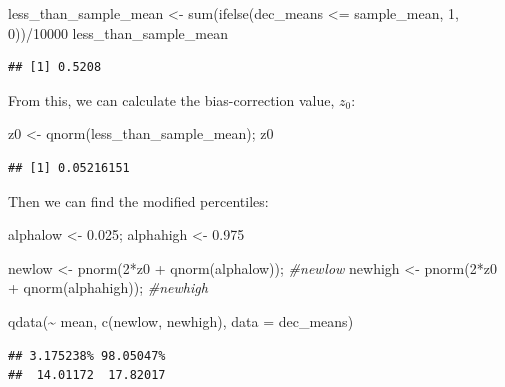 \documentclass[12pt]{article}
\newenvironment{Shaded}{\begin{snugshade}}{\end{snugshade}}
\newcommand{\AttributeTok}[1]{\textcolor[rgb]{0.77,0.63,0.00}{#1}}
\newcommand{\CommentTok}[1]{\textcolor[rgb]{0.56,0.35,0.01}{\textit{#1}}}
\newcommand{\DecValTok}[1]{\textcolor[rgb]{0.00,0.00,0.81}{#1}}
\newcommand{\FloatTok}[1]{\textcolor[rgb]{0.00,0.00,0.81}{#1}}
\newcommand{\FunctionTok}[1]{\textcolor[rgb]{0.00,0.00,0.00}{#1}}
\newcommand{\NormalTok}[1]{#1}
\newcommand{\OtherTok}[1]{\textcolor[rgb]{0.56,0.35,0.01}{#1}}
\newcommand{\SpecialCharTok}[1]{\textcolor[rgb]{0.00,0.00,0.00}{#1}}
\begin{document}
\begin{Shaded}
\begin{Highlighting}[]
\NormalTok{less\_than\_sample\_mean }\OtherTok{\textless{}{-}} \FunctionTok{sum}\NormalTok{(}\FunctionTok{ifelse}\NormalTok{(dec\_means }\SpecialCharTok{\textless{}=}\NormalTok{ sample\_mean, }\DecValTok{1}\NormalTok{, }\DecValTok{0}\NormalTok{))}\SpecialCharTok{/}\DecValTok{10000}
\NormalTok{less\_than\_sample\_mean}
\end{Highlighting}
\end{Shaded}

\begin{verbatim}
## [1] 0.5208
\end{verbatim}

From this, we can calculate the bias-correction value, \(z_0\):

\begin{Shaded}
\begin{Highlighting}[]
\NormalTok{z0 }\OtherTok{\textless{}{-}} \FunctionTok{qnorm}\NormalTok{(less\_than\_sample\_mean); z0}
\end{Highlighting}
\end{Shaded}

\begin{verbatim}
## [1] 0.05216151
\end{verbatim}

Then we can find the modified percentiles:

\begin{Shaded}
\begin{Highlighting}[]
\NormalTok{alphalow }\OtherTok{\textless{}{-}} \FloatTok{0.025}\NormalTok{; alphahigh }\OtherTok{\textless{}{-}} \FloatTok{0.975}

\NormalTok{newlow }\OtherTok{\textless{}{-}} \FunctionTok{pnorm}\NormalTok{(}\DecValTok{2}\SpecialCharTok{*}\NormalTok{z0 }\SpecialCharTok{+} \FunctionTok{qnorm}\NormalTok{(alphalow)); }\CommentTok{\#newlow}
\NormalTok{newhigh }\OtherTok{\textless{}{-}} \FunctionTok{pnorm}\NormalTok{(}\DecValTok{2}\SpecialCharTok{*}\NormalTok{z0 }\SpecialCharTok{+} \FunctionTok{qnorm}\NormalTok{(alphahigh)); }\CommentTok{\#newhigh}

\FunctionTok{qdata}\NormalTok{(}\SpecialCharTok{\textasciitilde{}}\NormalTok{ mean, }\FunctionTok{c}\NormalTok{(newlow, newhigh), }\AttributeTok{data =}\NormalTok{ dec\_means)}
\end{Highlighting}
\end{Shaded}

\begin{verbatim}
## 3.175238% 98.05047% 
##  14.01172  17.82017
\end{verbatim}
\end{document}

